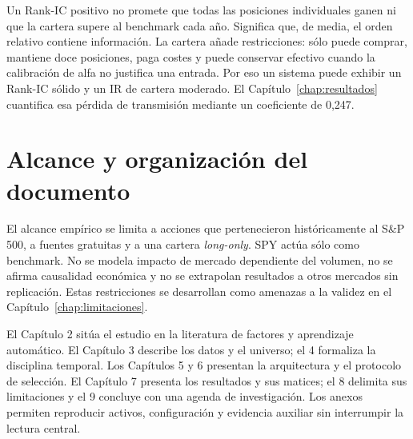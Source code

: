 Un Rank-IC positivo no promete que todas las posiciones individuales ganen ni que la cartera supere
al benchmark cada año. Significa que, de media, el orden relativo contiene información. La cartera
añade restricciones: sólo puede comprar, mantiene doce posiciones, paga costes y puede conservar
efectivo cuando la calibración de alfa no justifica una entrada. Por eso un sistema puede exhibir un
Rank-IC sólido y un IR de cartera moderado. El Capítulo~\ref{chap:resultados} cuantifica esa pérdida
de transmisión mediante un coeficiente de 0,247.

\section{Alcance y organización del documento}

El alcance empírico se limita a acciones que pertenecieron históricamente al S\&P 500, a fuentes
gratuitas y a una cartera \textit{long-only}. SPY actúa sólo como benchmark. No se modela impacto de
mercado dependiente del volumen, no se afirma causalidad económica y no se extrapolan resultados a
otros mercados sin replicación. Estas restricciones se desarrollan como amenazas a la validez en el
Capítulo~\ref{chap:limitaciones}.

El Capítulo 2 sitúa el estudio en la literatura de factores y aprendizaje automático. El Capítulo 3
describe los datos y el universo; el 4 formaliza la disciplina temporal. Los Capítulos 5 y 6
presentan la arquitectura y el protocolo de selección. El Capítulo 7 presenta los resultados y sus
matices; el 8 delimita sus limitaciones y el 9 concluye con una agenda de investigación. Los anexos
permiten reproducir activos, configuración y evidencia auxiliar sin interrumpir la lectura central.
